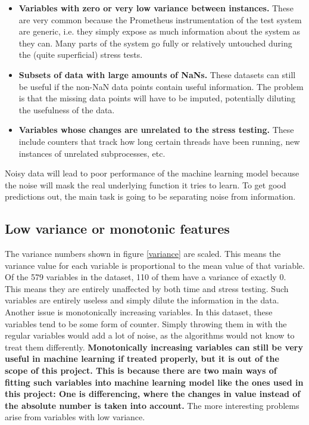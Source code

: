 \begin{itemize}
    \item \textbf{Variables with zero or very low variance between instances.} These are very common because the Prometheus instrumentation of the test system are generic, i.e. they simply expose as much information about the system as they can. Many parts of the system go fully or relatively untouched during the (quite superficial) stress tests.
    \item \textbf{Subsets of data with large amounts of NaNs.} These datasets can still be useful if the non-NaN data points contain useful information. The problem is that the missing data points will have to be imputed, potentially diluting the usefulness of the data. 
    \item \textbf{Variables whose changes are unrelated to the stress testing.} These include counters that track how long certain threads have been running, new instances of unrelated subprocesses, etc. 
\end{itemize}

Noisy data will lead to poor performance of the machine learning model because the noise will mask the real underlying function it tries to learn. To get good predictions out, the main task is going to be separating noise from information. 

\subsection{Low variance or monotonic features}
The variance numbers shown in figure \ref*{variance} are scaled. This means the variance value for each variable is proportional to the mean value of that variable.
Of the 579 variables in the dataset, 110 of them have a variance of exactly 0. This means they are entirely unaffected by both time and stress testing. Such variables are entirely useless and simply dilute the information in the data. 
Another issue is monotonically increasing variables. In this dataset, these variables tend to be some form of counter. Simply throwing them in with the regular variables would add a lot of noise, as the algorithms would not know to treat them differently.
\textbf{Monotonically increasing variables can still be very useful in machine learning if treated properly, but it is out of the scope of this project. This is because there are two main ways of fitting such variables into  machine learning model like the ones used in this project: One is differencing, where the changes in value instead of the absolute number is taken into account. }
The more interesting problems arise from variables with low variance. 

